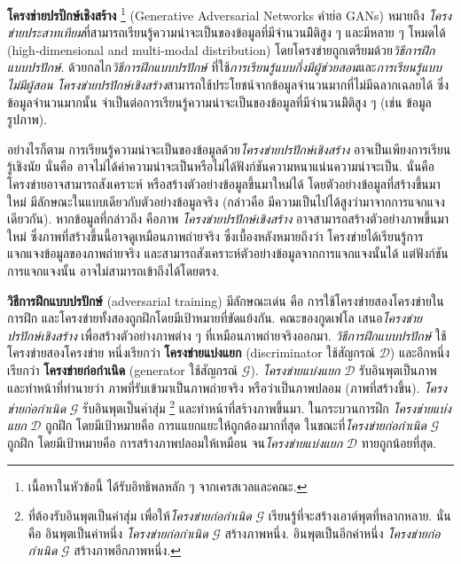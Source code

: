 \textbf{โครงข่ายปรปักษ์เชิงสร้าง}%
\footnote{%
เนื้อหาในหัวข้อนี้ ได้รับอิทธิพลหลัก ๆ จากเครสเวลและคณะ\cite{OverviewGAN2018}.
}
%
(Generative Adversarial Networks คำย่อ GANs)
หมายถึง \textit{โครงข่ายประสาทเทียม}ที่สามารถเรียนรู้ความน่าจะเป็นของข้อมูลที่มีจำนวนมิิติสูง ๆ และมีหลาย ๆ โหมดได้ (high-dimensional and multi-modal distribution)
โดยโครงข่ายถูกเตรียมด้วย\textit{วิธีการฝึกแบบปรปักษ์}.
ด้วยกลไก\textit{วิธีการฝึกแบบปรปักษ์} ที่ใช้\textit{การเรียนรู้แบบกึ่งมีผู้ช่วยสอน}และ\textit{การเรียนรู้แบบไม่มีผู้สอน}
\textit{โครงข่ายปรปักษ์เชิงสร้าง}สามารถใช้ประโยชน์จากข้อมูลจำนวนมากที่ไม่มีฉลากเฉลยได้
ซึ่งข้อมูลจำนวนมากนั้น จำเป็นต่อการเรียนรู้ความน่าจะเป็นของข้อมูลที่มีจำนวนมิิติสูง ๆ (เช่น ข้อมูลรูปภาพ).

อย่างไรก็ตาม การเรียนรู้ความน่าจะเป็นของข้อมูลด้วย\textit{โครงข่ายปรปักษ์เชิงสร้าง}
อาจเป็นเพียงการเรียนรู้เชิงนัย นั่นคือ อาจไม่ได้ค่าความน่าจะเป็นหรือไม่ได้ฟังก์ชันความหนาแน่นความน่าจะเป็น.
นั่นคือ 
โครงข่ายอาจสามารถสังเคราะห์ หรือสร้างตัวอย่างข้อมูลขึ้นมาใหม่ได้ 
โดยตัวอย่างข้อมูลที่สร้างขึ้นมาใหม่ มีลักษณะในแบบเดียวกับตัวอย่างข้อมูลจริง (กล่าวคือ มีความเป็นไปได้สูงว่ามาจากการแจกแจงเดียวกัน).
หากข้อมูลที่กล่าวถึง คือภาพ
\textit{โครงข่ายปรปักษ์เชิงสร้าง} อาจสามารถสร้างตัวอย่างภาพขึ้นมาใหม่ ซึ่งภาพที่สร้างขึ้นนี้อาจดูเหมือนภาพถ่ายจริง
ซึ่งเบื้องหลังหมายถึงว่า โครงข่ายได้เรียนรู้การแจกแจงข้อมูลของภาพถ่ายจริง และสามารถสังเคราะห์ตัวอย่างข้อมูลจากการแจกแจงนั้นได้
แต่ฟังก์ชันการแจกแจงนั้น อาจไม่สามารถเข้าถึงได้โดยตรง.

\textbf{วิธีการฝึกแบบปรปักษ์}  (adversarial training)
มีลักษณะเด่น คือ การใช้โครงข่ายสองโครงข่ายในการฝึก และโครงข่ายทั้งสองถูกฝึกโดยมีเป้าหมายที่ขัดแย้งกัน.
%
คณะของกูดเฟโล\cite{GoodfellowEtAl2014a} เสนอ\textit{โครงข่ายปรปักษ์เชิงสร้าง} เพื่อสร้างตัวอย่างภาพต่าง ๆ ที่เหมือนภาพถ่ายจริงออกมา.
\textit{วิธีการฝึกแบบปรปักษ์} ใช้โครงข่ายสองโครงข่าย หนึ่งเรียกว่า \textbf{โครงข่ายแบ่งแยก} (discriminator ใช้สัญกรณ์ $\mathcal{D}$)
และอีกหนึ่ง เรียกว่า \textbf{โครงข่ายก่อกำเนิด} (generator ใช้สัญกรณ์ $\mathcal{G}$).
\textit{โครงข่ายแบ่งแยก} $\mathcal{D}$ รับอินพุตเป็นภาพ และทำหน้าที่ทำนายว่า ภาพที่รับเข้ามาเป็นภาพถ่ายจริง หรือว่าเป็นภาพปลอม (ภาพที่สร้างขึ้น).
\textit{โครงข่ายก่อกำเนิด} $\mathcal{G}$ รับอินพุตเป็นค่าสุ่ม%
\footnote{%
ที่ต้องรับอินพุตเป็นค่าสุ่ม เพื่อให้\textit{โครงข่ายก่อกำเนิด} $\mathcal{G}$ เรียนรู้ที่จะสร้างเอาต์พุตที่หลากหลาย.
นั่นคือ อินพุตเป็นค่าหนึ่ง \textit{โครงข่ายก่อกำเนิด} $\mathcal{G}$ สร้างภาพหนึ่ง.
อินพุตเป็นอีกค่าหนึ่ง \textit{โครงข่ายก่อกำเนิด} $\mathcal{G}$ สร้างภาพอีกภาพหนึ่ง.
}
%
และทำหน้าที่สร้างภาพขึ้นมา.
ในกระบวนการฝึก
\textit{โครงข่ายแบ่งแยก} $\mathcal{D}$ ถูกฝึก โดยมีเป้าหมายคือ การแแยกแยะให้ถูกต้องมากที่สุด
ในขณะที่\textit{โครงข่ายก่อกำเนิด} $\mathcal{G}$ ถูกฝึก โดยมีเป้าหมายคือ การสร้างภาพปลอมให้เหมือน
จน\textit{โครงข่ายแบ่งแยก} $\mathcal{D}$ ทายถูกน้อยที่สุด.

